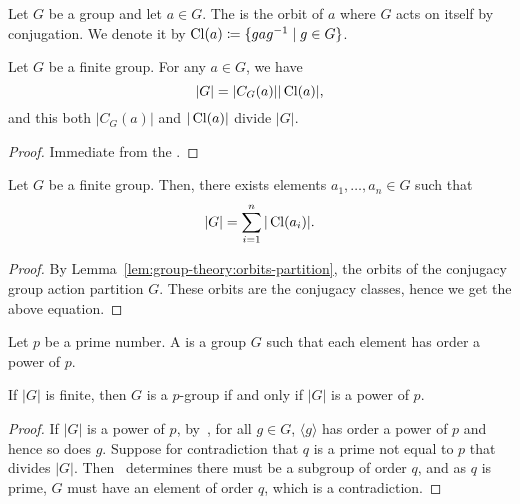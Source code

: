 \begin{definition}\label{def:group-theory:conjugacy-class}
  Let \(G\) be a group and let \(a \in G\). The  is the orbit of \(a\) where \(G\) acts on itself by conjugation. We denote it by \(\operatorname{Cl}(a) \coloneqq \{gag^{-1} \mid g \in G\}\).
\end{definition}

\begin{corollary}\label{cor:group-theory:centralizer-conjugacy-classes-divide-G}
  Let \(G\) be a finite group. For any \(a \in G\), we have
  \[|G| = |C_{G}(a)| |\operatorname{Cl}(a)|,\]
  and this both \(|C_{G}(a)|\) and \(|\operatorname{Cl}(a)|\) divide \(|G|\).
\end{corollary}

\begin{proof}
  Immediate from the .
\end{proof}

\begin{corollary}\label{cor:group-theory:class-equation}
  Let \(G\) be a finite group. Then, there exists elements \(a_{1}, \ldots, a_{n} \in G\) such that
  \[|G| = \sum_{i=1}^{n} |\operatorname{Cl}(a_{i})|.\]
\end{corollary}

\begin{proof}
  By Lemma~\ref{lem:group-theory:orbits-partition}, the orbits of the conjugacy group action partition \(G\). These orbits are the conjugacy classes, hence we get the above equation.
\end{proof}


\begin{definition}
  Let \(p\) be a prime number. A  is a group \(G\) such that each element has order a power of \(p\).
\end{definition}

\begin{lemma}\label{lem:group-theory:p-group-has-order-p^n}
  If \(|G|\) is finite, then \(G\) is a \(p\)-group if and only if \(|G|\) is a power of \(p\).
\end{lemma}

\begin{proof}
  If \(|G|\) is a power of \(p\), by~, for all \(g \in G\), \(\langle g \rangle\) has order a power of \(p\) and hence so does \(g\). Suppose for contradiction that \(q\) is a prime not equal to \(p\) that divides \(|G|\). Then~ determines there must be a subgroup of order \(q\), and as \(q\) is prime, \(G\) must have an element of order \(q\), which is a contradiction.
\end{proof}


